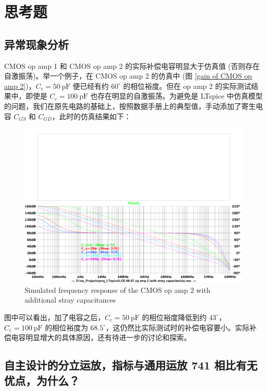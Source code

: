 \documentclass[UTF8]{article}
\begin{document}
\section{思考题}

\subsection{异常现象分析}

CMOS op amp 1 和 CMOS op amp 2 的实际补偿电容明显大于仿真值 (否则存在自激振荡)。举一个例子，在 CMOS op amp 2 的仿真中 (图 \ref{gain of CMOS op amp 2})，$C_c = 50\ \mathrm{pF}$ 便已经有约 $60^\circ$ 的相位裕度。但在 op amp 2 的实际测试结果中，即使是 $C_c = 100 \ \mathrm{pF}$ 也存在明显的自激振荡。为避免是 LTspice 中仿真模型的问题，我们在原先电路的基础上，按照数据手册上的典型值，手动添加了寄生电容 $C_{GS}$ 和 $C_{GD}$，此时的仿真结果如下：

\begin{figure}[H]\centering
    \includegraphics[width=\columnwidth]{LCE-06-07-运放设计/assets/appendix/gain of CMOS op amp 2 (with stray cap).pdf}
    \caption{Simulated frequency response of the CMOS op amp 2 with additional stray capacitances}
    \label{gain of CMOS op amp 2 (with stray cap)}
\end{figure}

图中可以看出，加了电容之后，$C_c = 50 \ \mathrm{pF}$ 的相位裕度降低到约 $43^\circ$，$C_c = 100 \ \mathrm{pF}$ 的相位裕度为 $68.5^\circ$，这仍然比实际测试时的补偿电容要小。实际补偿电容明显增大的具体原因，还有待进一步的讨论和探索。


\subsection{自主设计的分立运放，指标与通用运放 741 相比有无优点，为什么？}
\end{document}
